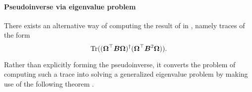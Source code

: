 \paragraph{Pseudoinverse via eigenvalue problem}

There exists an alternative way of computing the result of 
in , namely traces of the form
\begin{equation}
    \operatorname{Tr}((\boldsymbol{\Omega}^{\top} \boldsymbol{B} \boldsymbol{\Omega})^{\dagger}(\boldsymbol{\Omega}^{\top} \boldsymbol{B}^2 \boldsymbol{\Omega})).
    \label{equ:3-nystrom-trace-pseudo-inverse}
\end{equation}

Rather than explicitly forming the pseudoinverse,
it converts the problem of computing such a trace into solving a generalized
eigenvalue problem by making use of the following theorem \cite[theorem~3]{lin2017randomized}.

